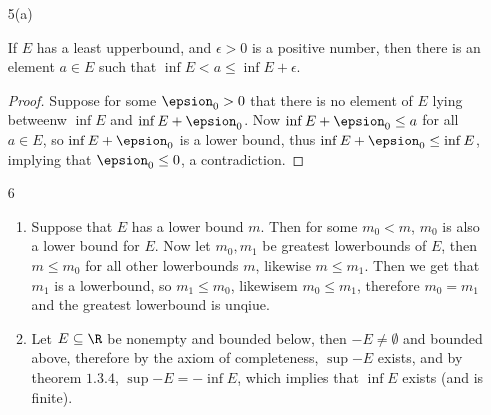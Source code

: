 \begin{enumerate}[label=(\arabic*)]
     \item[5(a)] \begin{theorem}
                If $E$ has a least upperbound, and $\epsilon>0$ is a positive number, then there is an element $a \in E$ such 
                that $\inf{E} < a \leq \inf{E}+\epsilon$.

            \end{theorem}
            \begin{proof}
                Suppose for some $\epsion_0>0$ that there is no element of  $E$ lying betweenw  $\inf{E}$ and $\inf{E}+\epsion_0$. 
                Now $\inf{E}+\epsion_0 \leq a$ for all  $a \in E$, so  $\inf{E}+\epsion_0$ is a lower bound, thus 
                $\inf{E}+\epsion_0 \leq \inf{E}$, implying that $\epsion_0 \leq 0$, a contradiction. 
            \end{proof}

        \item[6]
            \begin{enumerate}
                \item Suppose that $E$ has a lower bound  $m$. Then for some  $m_0<m$, $m_0$ is also a lower bound for $E$. 
                    Now let  $m_0,m_1$ be greatest lowerbounds of $E$, then  $m \leq m_0$ for all other lowerbounds  $m$, likewise 
                     $m \leq m_1$. Then we get that $m_1$ is a lowerbound, so $m_1 \leq m_0$, likewisem $m_0 \leq m_1$, therefore 
                     $m_0=m_1$ and the greatest lowerbound is unqiue.

                \item Let $E \subseteq \R$ be nonempty and bounded below, then  $-E \neq \emptyset$ and bounded above, therefore 
                    by the axiom of completeness,  $\sup{-E}$ exists, and by theorem  $1.3.4$,  $\sup{-E}=-\inf{E}$, which 
                    implies that  $\inf{E}$ exists (and is finite).
            \end{enumerate}

\end{enumerate}
